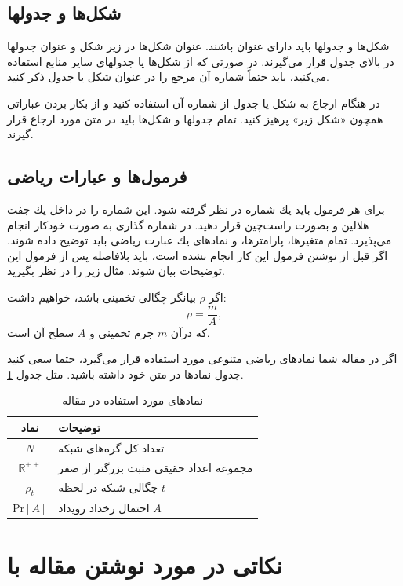 \documentclass{CSICC2016}
\begin{document}
\subsection{شكل‌ها و جدول­ها}
شكل‌ها و جدول­ها باید دارای عنوان باشند. عنوان شكل‌ها در زیر شكل و عنوان جدول­ها در بالای جدول قرار می‌گیرند. در صورتی كه از شكل‌ها یا جدول­های سایر منابع استفاده می‌كنید، باید حتماً شماره آن مرجع را در عنوان شكل یا جدول ذكر كنید.

در هنگام ارجاع به شكل یا جدول از شماره آن استفاده كنید و از بكار بردن عباراتی همچون «شكل زیر» پرهیز كنید. تمام جدول­ها و شكل‌ها باید در متن مورد ارجاع قرار گیرند. 


\subsection{ فرمول‌ها و عبارات ریاضی}
برای هر فرمول باید یك شماره در نظر گرفته شود. این شماره را در داخل یك جفت هلالین و بصورت راست‌چین قرار دهید.  در   \lr{\LaTeX}  شماره گذاری به صورت خودکار انجام می‌پذیرد. تمام متغیرها، پارامترها، و نمادهای یك عبارت ریاضی باید توضیح داده شوند. اگر قبل از نوشتن فرمول این كار انجام نشده است، باید بلافاصله پس از فرمول این توضیحات بیان شوند. مثال زیر را در نظر بگیرید.

اگر $\rho$ بیانگر چگالی تخمینی باشد، خواهیم داشت:
\begin{equation}
\rho = \frac{m}{A},
\end{equation}
كه درآن  $m$ جرم تخمینی و $A$ سطح آن است. 

اگر در مقاله شما نمادهای ریاضی متنوعی مورد استفاده قرار می‌گیرد، حتما سعی کنید جدول نمادها در متن خود داشته باشید. مثل جدول \ref{tab:symbols}.
\begin{table}[H]
\centering
\caption{نمادهای مورد استفاده در  مقاله}
\label{tab:symbols}
\begin{tabular}{cp{6cm}}\hline
نماد & توضیحات
\\\hline
$N$ &
تعداد کل گره‌های شبکه
\\
$\mathbb{R}^{++}$ &
مجموعه اعداد حقیقی مثبت بزرگتر از صفر
\\
$\rho_{t}$ &
چگالی شبکه در لحظه $t$
\\
$\mathrm{Pr}[A]$ &
احتمال رخداد رویداد $A$
\\
\hline
\end{tabular}
\end{table}







\section{نکاتی در مورد نوشتن مقاله با \lr{\LaTeX}}
\end{document}
